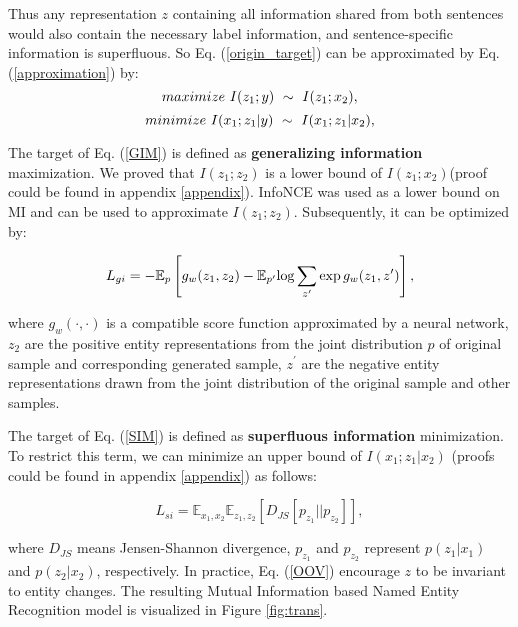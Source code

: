 \documentclass[11pt]{article}
\begin{document}
Thus any representation $z$ containing all information shared from both sentences would also contain the necessary label information, and sentence-specific information is superfluous. So Eq. (\ref{origin_target}) can be approximated by Eq. (\ref{approximation}) by:
\begin{equation}
\setlength{\abovedisplayskip}{10pt}
\setlength{\belowdisplayskip}{1pt}
maximize\ I(z_1; y)\  \sim \  I(z_1; x_2),
\label{GIM}
\end{equation}
\begin{equation}
\setlength{\abovedisplayskip}{1pt}
\setlength{\belowdisplayskip}{10pt}
minimize\ I(x_1;z_1| y) \ \sim \ I(x_1;z_1|x_2), 
\label{SIM}
\end{equation}

The target of Eq. (\ref{GIM}) is defined as \textbf{generalizing information} maximization. We proved that $I(z_1; z_2)$ is a lower bound of $I(z_1;x_2)$(proof could be found in appendix \ref{appendix}). InfoNCE \cite{oord2018representation} was used as a lower bound on MI and can be used to approximate $I(z_1; z_2)$. Subsequently, it can be  optimized by:

\begin{equation}
\small L_{gi} = - \mathbb{E}_p \left [ g_w(z_1,z_2) - \mathbb{E}_{p^\prime} {\log{\sum_{z^{\prime}} {\exp g_w(z_1,z^{\prime})}}} \right ],
\label{MI}
\end{equation} 

where $g_w(\cdot,\cdot)$ is a compatible score function approximated by a neural network, $z_2$ are the positive entity representations from the joint distribution $p$ of original sample and corresponding generated sample, $z^\prime$ are the negative entity representations drawn from the joint distribution of the original sample and other samples.


The target of Eq. (\ref{SIM}) is defined as \textbf{superfluous information} minimization. To restrict this term, we can minimize an upper bound of $I(x_1;z_1|x_2)$ (proofs could be found in appendix \ref{appendix}) as follows:

\begin{equation}
L_{si} = \mathbb{E}_{x_1,x_2} \mathbb{E}_{z_1,z_2} \left [ D_{JS} {\left [ {p_{z_1}||p_{z_2}} \right ]}  \right ] ,
\label{OOV}
\end{equation}

where $D_{JS}$ means Jensen-Shannon divergence, $p_{z_1}$ and $p_{z_2}$ represent $p(z_1|x_1)$ and $p(z_2|x_2)$, respectively. In practice, Eq. (\ref{OOV}) encourage $z$ to be invariant to entity changes.
The resulting Mutual Information based Named Entity Recognition model is visualized in Figure \ref{fig:trans}.
\end{document}
